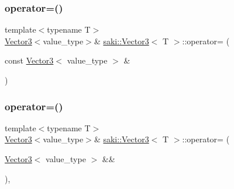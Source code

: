 \mbox{\label{classsaki_1_1_vector3_ad26b48b9e32f5ecf34d15b366bccd3ef}} 
\subsubsection{\texorpdfstring{operator=()}{operator=()}\hspace{0.1cm}{\footnotesize\ttfamily [1/2]}}
{\footnotesize\ttfamily template$<$typename T$>$ \\
\mbox{\hyperlink{classsaki_1_1_vector3}{Vector3}}$<$value\+\_\+type$>$\& \mbox{\hyperlink{classsaki_1_1_vector3}{saki\+::\+Vector3}}$<$ T $>$\+::operator= (\begin{DoxyParamCaption}\item[{const \mbox{\hyperlink{classsaki_1_1_vector3}{Vector3}}$<$ value\+\_\+type $>$ \&}]{ }\end{DoxyParamCaption})\hspace{0.3cm}{\ttfamily [default]}}

\mbox{\label{classsaki_1_1_vector3_a714922994d6fa229fa4a44a322fd20a6}} 
\subsubsection{\texorpdfstring{operator=()}{operator=()}\hspace{0.1cm}{\footnotesize\ttfamily [2/2]}}
{\footnotesize\ttfamily template$<$typename T$>$ \\
\mbox{\hyperlink{classsaki_1_1_vector3}{Vector3}}$<$value\+\_\+type$>$\& \mbox{\hyperlink{classsaki_1_1_vector3}{saki\+::\+Vector3}}$<$ T $>$\+::operator= (\begin{DoxyParamCaption}\item[{\mbox{\hyperlink{classsaki_1_1_vector3}{Vector3}}$<$ value\+\_\+type $>$ \&\&}]{ }\end{DoxyParamCaption})\hspace{0.3cm}{\ttfamily [default]}, {\ttfamily [noexcept]}}

\mbox{\label{classsaki_1_1_vector3_ac7f0fe0070c06ca0fd03b80225588fc8}} 
